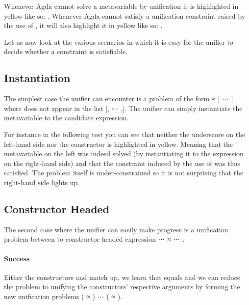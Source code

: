 
Whenever Agda cannot solve a metavariable by unification it is highlighted
in yellow like so: \AgdaUnsolvedMeta{\_}. Whenever Agda cannot satisfy a
unification constraint raised by the use of , it will also highlight
it in yellow like so: .

Let us now look at the various scenarios in which it is easy for the unifier
to decide whether a constraint is satisfiable.

\subsection{Instantiation}

The simplest case the unifier can encounter is a problem of the form
{ ≈ [ ⋯ ]} where  does not appear
in the list {[, ⋯ ,]}. The unifier can simply instantiate
the metavariable to the candidate expression.

For instance in the following test you can see that neither the underscore
on the left-hand side nor the  constructor is highlighted in yellow.
Meaning that the metavariable on the left was indeed solved (by instantiating
it to the expression on the right-hand side) and that the constraint induced
by the use of  was thus satisfied. The problem itself is
under-constrained so it is not surprising that the right-hand side lights up.


\subsection{Constructor Headed}

The second case where the unifier can easily make progress is a unification
problem between to constructor-headed expression
{  ⋯  ≈   ⋯ }.

\paragraph{Success} Either the constructors  and  match up, we learn
that  equals  and we can reduce the problem to unifying the constructors'
respective arguments by forming the new unification problems
{( ≈ ) ⋯ ( ≈ )}.

